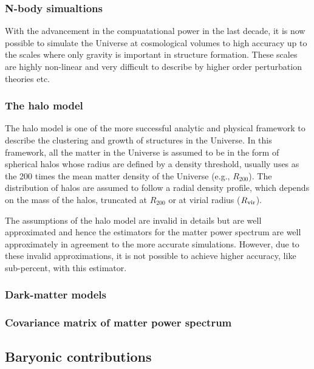 \subsubsection{N-body simualtions}

With the advancement in the compuatational power in the last decade, it is now possible to
simulate the Universe at cosmological volumes to high accuracy up to the scales where
only gravity is important in structure formation. These scales are highly non-linear and
very difficult to describe by higher order perturbation theories etc. 

\subsubsection{The halo model}

The halo model is one of the more successful analytic and physical framework to describe
the clustering and growth of structures in the Universe. In this framework, all the matter
in the Universe is assumed to be in the form of spherical halos whose radius are defined by a 
density threshold, usually uses as the 200 times the mean matter density of the Universe 
(e.g., $R_{200}$). The  distribution of halos are assumed to follow a radial density 
profile, which depends on the mass of the halos, truncated at $R_{200}$ or at virial 
radius ($R_{\rm vir}$).

The assumptions of the halo model are invalid in details but are well approximated and 
hence the estimators for the matter power spectrum are well approximately in agreement
to the more accurate simulations. However, due to these invalid approximations, it is not
possible to achieve higher accuracy, like sub-percent, with this estimator. 



\subsubsection{Dark-matter models}
\subsubsection{Covariance matrix of matter power spectrum}
\subsection{Baryonic contributions}

